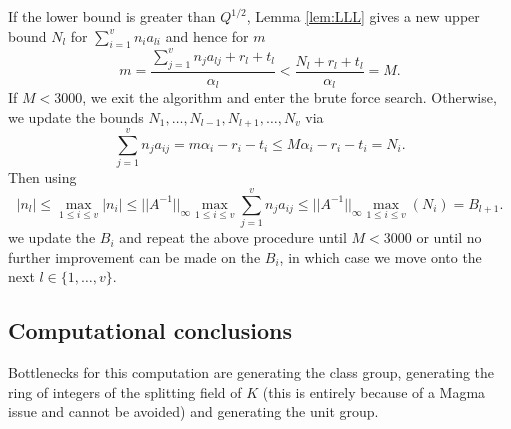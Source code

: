 {If the lower bound is greater than $Q^{1/2}$, Lemma \ref{lem:LLL} gives a new upper bound $N_l$ for $\sum_{i = 1}^v n_{i}a_{li}$ and hence for $m$
\[m = \frac{\sum_{j = 1}^{v}n_ja_{lj} + r_l + t_l}{\alpha_l} < \frac{N_l+ r_l + t_l}{\alpha_l} = M.\]
If $M < 3000$, we exit the algorithm and enter the brute force search. Otherwise, we update the bounds $N_1, \dots, N_{l-1}, N_{l+1}, \dots, N_v$ via
\[\sum_{j=1}^v n_ja_{ij} = m\alpha_i - r_i - t_i \leq M\alpha_i - r_i - t_i = N_i.\]
Then using 
\[|n_l| \leq \max_{1 \leq i \leq v}|n_i| \leq ||A^{-1}||_{\infty}\max_{1 \leq i\leq v}\sum_{j = 1}^v n_j a_{ij}
\leq ||A^{-1}||_{\infty} \max_{1 \leq i\leq v}(N_i) = B_{l+1}.\]
we update the $B_i$ and repeat the above procedure until $M < 3000$ or until no further improvement can be made on the $B_i$, in which case we move onto the next $l \in \{1, \dots, v\}$.


\subsection{Computational conclusions}

Bottlenecks for this computation are generating the class group, generating the ring of integers of the splitting field of $K$ (this is entirely because of a Magma issue and cannot be avoided) and generating the unit group. 



}
